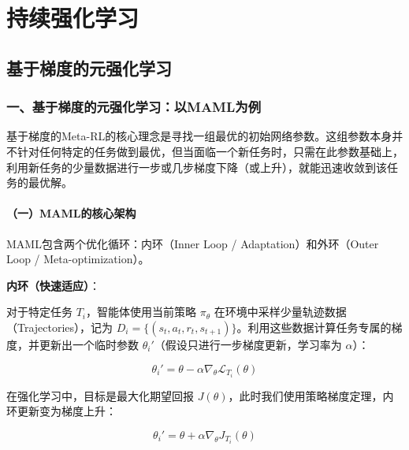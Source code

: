 \hypertarget{ux6301ux7eedux5f3aux5316ux5b66ux4e60}{%
\chapter{持续强化学习}\label{ux6301ux7eedux5f3aux5316ux5b66ux4e60}}

\hypertarget{ux57faux4e8eux68afux5ea6ux7684ux5143ux5f3aux5316ux5b66ux4e60}{%
\section{基于梯度的元强化学习}\label{ux57faux4e8eux68afux5ea6ux7684ux5143ux5f3aux5316ux5b66ux4e60}}

\hypertarget{ux4e00ux57faux4e8eux68afux5ea6ux7684ux5143ux5f3aux5316ux5b66ux4e60ux4ee5mamlux4e3aux4f8b}{%
\subsection{一、基于梯度的元强化学习：以MAML为例}\label{ux4e00ux57faux4e8eux68afux5ea6ux7684ux5143ux5f3aux5316ux5b66ux4e60ux4ee5mamlux4e3aux4f8b}}

基于梯度的Meta-RL的核心理念是寻找一组最优的初始网络参数。这组参数本身并不针对任何特定的任务做到最优，但当面临一个新任务时，只需在此参数基础上，利用新任务的少量数据进行一步或几步梯度下降（或上升），就能迅速收敛到该任务的最优解。

\hypertarget{ux4e00mamlux7684ux6838ux5fc3ux67b6ux6784}{%
\subsubsection{（一）MAML的核心架构}\label{ux4e00mamlux7684ux6838ux5fc3ux67b6ux6784}}

MAML包含两个优化循环：内环（Inner Loop / Adaptation）和外环（Outer Loop / Meta-optimization）。

\textbf{内环（快速适应）}：

对于特定任务 \(T_i\)，智能体使用当前策略 \(\pi_\theta\) 在环境中采样少量轨迹数据（Trajectories），记为 \(D_i = \{(s_t, a_t, r_t, s_{t+1})\}\)。利用这些数据计算任务专属的梯度，并更新出一个临时参数 \(\theta_i'\)（假设只进行一步梯度更新，学习率为 \(\alpha\)）：

\[
\theta_i' = \theta - \alpha \nabla_\theta \mathcal{L}_{T_i}(\theta)
\]

在强化学习中，目标是最大化期望回报 \(J(\theta)\)，此时我们使用策略梯度定理，内环更新变为梯度上升：

\[
\theta_i' = \theta + \alpha \nabla_\theta J_{T_i}(\theta)
\]

